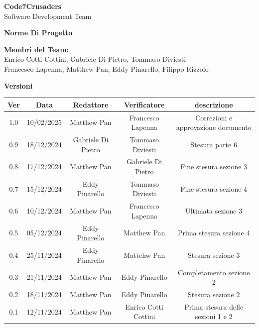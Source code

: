 \documentclass{article}
\begin{document}
\begin{titlepage}
    \vspace{1cm}
    
    {\Huge \textbf{Code7Crusaders}}\\
    \vspace{0.5cm}
    {\Large Software Development Team}\\
    \vspace{2cm}
    
    \large \textbf{Norme Di Progetto}
    \vspace{3.9cm}

    \textbf{Membri del Team:}\\
    Enrico Cotti Cottini, Gabriele Di Pietro, Tommaso Diviesti \\
    Francesco Lapenna, Matthew Pan, Eddy Pinarello, Filippo Rizzolo \\
    \vspace{0.5cm}
    
    \vspace{1cm}
\end{titlepage}



\newpage
\begin{center}
    \textbf{Versioni}
    \\
    \vspace{0.3cm}
    \begin{tabular}{|c|c|c|c|c|}
        \hline
        \textbf{Ver} & \textbf{Data} & \textbf{Redattore} & \textbf{Verificatore} & \textbf{descrizione}\\
        \hline
        1.0 & 10/02/2025 & Matthew Pan & Francesco Lapenna & Correzioni e approvazione documento \\ 
        0.9 & 18/12/2024 & Gabriele Di Pietro & Tommaso Diviesti & Stesura parte 6 \\ 
        0.8 & 17/12/2024 & Matthew Pan &   Gabriele Di Pietro & Fine stesura sezione 3\\
        0.7 & 15/12/2024 & Eddy Pinarello & Tommaso Diviesti & Fine stesura sezione 4\\
        0.6 & 10/12/2024 & Matthew Pan & Francesco Lapenna & Ultimata sezione 3\\
        0.5 & 05/12/2024 & Eddy Pinarello & Matthew Pan       & Prima stesura sezione 4\\
        0.4 & 25/11/2024 & Eddy Pinarello & Mattehw Pan       & Stesura sezione 3\\
        0.3 & 21/11/2024 & Matthew Pan &    Eddy Pinarello    & Completamento sezione 2\\
        0.2 & 18/11/2024 & Matthew Pan &    Eddy Pinarello    & Stesura sezione 2\\
        0.1 & 12/11/2024 & Matthew Pan & Enrico Cotti Cottini & Prima stesura delle sezioni 1 e 2\\
        \hline
    \end{tabular}
\end{center}
\end{document}
